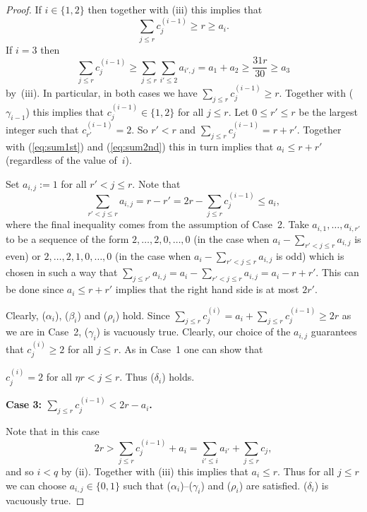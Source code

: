 \documentclass{memo-l}
\def\COMMENT#1{}
\numberwithin{section}{chapter}
\numberwithin{equation}{section}
\numberwithin{firstthm}{section}
\numberwithin{figure}{section}
\begin{document}
{\begin{proof}
\noindent
If $i\in \{1,2\}$ then together with (iii) this implies that
\begin{equation}\label{eq:sum1st}
\sum_{j \le r} c^{(i-1)}_j\ge r\ge a_i.
\end{equation}
If $i=3$ then
\begin{equation}\label{eq:sum2nd}
\sum_{j \le r} c^{(i-1)}_j\ge \sum_{j\le r} \sum_{i' \le 2} a_{i',j}=a_1+a_2\ge \frac{31r}{30}\ge a_3
\end{equation}
 by~(iii). In particular, in both cases we have $\sum_{j \le r} c^{(i-1)}_j\ge r$.
Together with ($\gamma_{i-1}$) this implies that $c^{(i-1)}_j \in \{ 1 , 2\}$ for all $j \le r$.
Let $0\le r'\le r$ be the largest integer such that $c^{(i-1)}_{r'} = 2$. 
So $r' < r$ and $\sum_{j \le r} c^{(i-1)}_j  = r+r' $. Together with (\ref{eq:sum1st}) and (\ref{eq:sum2nd})
this in turn implies that $a_i \le r+r'$ (regardless of the value of~$i$). 

Set $a_{i,j}:=1$ for all $r'<j\le r$. Note that
$$\sum_{r'<j\le r} a_{i,j}=r-r'=2r-\sum_{j \le r} c^{(i-1)}_j \le a_i,$$
where the final inequality comes from the assumption of Case~2. Take $a_{i,1},\dots,a_{i,r'}$ to be a sequence of the form $2,\dots,2,0,\dots,0$
(in the case when $a_i-\sum_{r'<j\le r} a_{i,j}$ is even)
or $2,\dots,2,1,0,\dots,0$ (in the case when $a_i-\sum_{r'<j\le r} a_{i,j}$ is odd) which is chosen in such a way
that $\sum_{j\le r'} a_{i,j}=a_i-\sum_{r'<j\le r} a_{i,j} = a_i-r+r'$. This can be done since $a_i \le r+r'$ implies that the right hand side is at most $2r'$.

Clearly, ($\alpha_i$), ($\beta_i$) and ($\rho_i$) hold.
Since $\sum_{j\le r} c^{(i)}_j=a_i+\sum_{j\le r} c^{(i-1)}_j \ge 2r$ as we are in Case~2,
($\gamma_i$) is vacuously true. Clearly, our choice of the $a_{i,j}$ guarantees that $c^{(i)}_j\ge 2$ for all $j\le r$.
As in Case~1 one can show that%
    \COMMENT{If $c^{(i)}_{\eta r+1}> 2$ then we must have that $r'>\eta r$ and $c^{(i)}_j= 4$ for all $j\le \eta r$.
Now the same argument as in Case~1 gives a contradiction.}
$c^{(i)}_j= 2$ for all $\eta r<j\le r$. Thus ($\delta_i$) holds.

\medskip

\noindent\textbf{Case 3: $\sum_{j \le r} c^{(i-1)}_j < 2r - a_i$.}

\smallskip

\noindent
Note that in this case
$$
2r>\sum_{j \le r} c^{(i-1)}_j +a_i = \sum_{i' \le i} a_{i'} + \sum_{j \le r }c_j ,$$
and so $i < q$ by (ii). Together with (iii) this implies that $a_i \le r$. Thus for all $j \le r$
we can choose $a_{i,j} \in \{0,1\}$ such that ($\alpha_i$)--($\gamma_i$) and ($\rho_i$) are satisfied.
($\delta_i$) is vacuously true.


\end{proof}}
\end{document}
